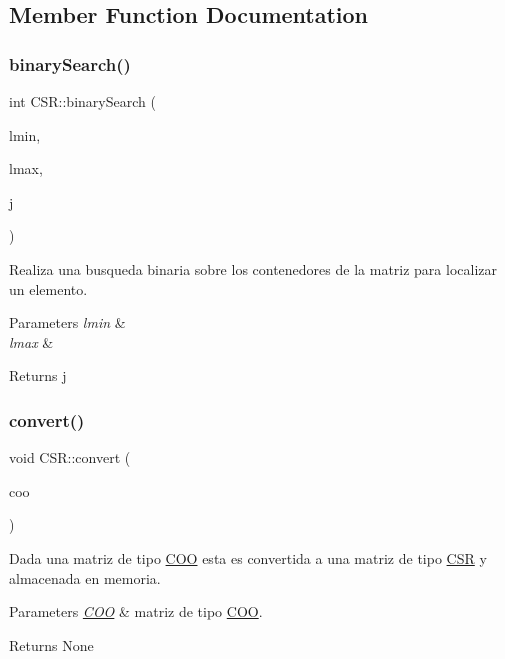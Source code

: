 \subsection{Member Function Documentation}
\hypertarget{class_c_s_r_a3aea9588569f106af8d753ac16ed3215}{}\label{class_c_s_r_a3aea9588569f106af8d753ac16ed3215} 
\subsubsection{\texorpdfstring{binary\+Search()}{binarySearch()}}
{\footnotesize\ttfamily int C\+S\+R\+::binary\+Search (\begin{DoxyParamCaption}\item[{int}]{lmin,  }\item[{int}]{lmax,  }\item[{int}]{j }\end{DoxyParamCaption})}



Realiza una busqueda binaria sobre los contenedores de la matriz para localizar un elemento. 


\begin{DoxyParams}{Parameters}
{\em lmin} & \\
\hline
{\em lmax} & \\
\hline
\end{DoxyParams}
\begin{DoxyReturn}{Returns}
j 
\end{DoxyReturn}
\hypertarget{class_c_s_r_aa8e97652354b0c384cc420ed5f50f353}{}\label{class_c_s_r_aa8e97652354b0c384cc420ed5f50f353} 
\subsubsection{\texorpdfstring{convert()}{convert()}}
{\footnotesize\ttfamily void C\+S\+R\+::convert (\begin{DoxyParamCaption}\item[{\hyperlink{class_c_o_o}{C\+OO} const \&}]{coo }\end{DoxyParamCaption})}



Dada una matriz de tipo \hyperlink{class_c_o_o}{C\+OO} esta es convertida a una matriz de tipo \hyperlink{class_c_s_r}{C\+SR} y almacenada en memoria. 


\begin{DoxyParams}{Parameters}
{\em \hyperlink{class_c_o_o}{C\+OO}} & matriz de tipo \hyperlink{class_c_o_o}{C\+OO}. \\
\hline
\end{DoxyParams}
\begin{DoxyReturn}{Returns}
None 
\end{DoxyReturn}
\hypertarget{class_c_s_r_a113b4ec55800f1e6e447deff6cdc5352}{}\label{class_c_s_r_a113b4ec55800f1e6e447deff6cdc5352} 
